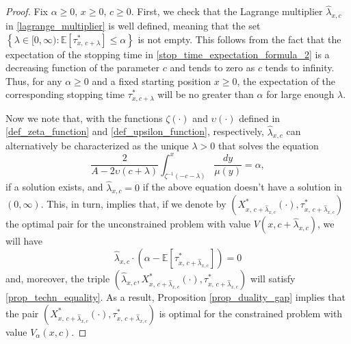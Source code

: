 \documentclass[11pt,tbtags,reqno]{article}
\theoremstyle{definition}
\numberwithin{equation}{section}
\theoremstyle{definition}
\newcommand{\ex}{\mathbb{E}}
\begin{document}
\begin{proof}
Fix $\alpha \ge 0, \, x \ge 0, \, c \ge 0$. First, we check that the Lagrange multiplier $\widehat{\lambda}_{x, c}$ in \eqref{lagrange_multiplier} is well defined, meaning that the set $\left\{\lambda \in [0, \infty): \ex\left[\tau^*_{x, \, c + \lambda}\right] \le \alpha \right\}$ is not empty. This follows from the fact that the expectation of the stopping time in \eqref{stop_time_expectation_formula_2} is a decreasing function of the parameter $c$ and tends to zero as $c$ tends to infinity. Thus, for any $\alpha \ge 0$ and a fixed starting position $x \ge 0$, the expectation of the corresponding stopping time $\tau^*_{x, c + \lambda}$ will be no greater than $\alpha$ for large enough $\lambda$.

Now we note that, with the functions $\zeta(\cdot)$ and $\upsilon(\cdot)$ defined in \eqref{def_zeta_function} and \eqref{def_upsilon_function}, respectively, $\widehat{\lambda}_{x, c}$ can alternatively be characterized as the unique $\lambda > 0$ that solves the equation
\begin{equation}
    \frac{2}{A - 2\upsilon(c + \lambda)}\int_{\zeta^{-1}(-c-\lambda)}^x \frac{dy}{\mu(y)} = \alpha,
\end{equation}
if a solution exists, and $\widehat{\lambda}_{x, c} = 0$ if the above equation doesn't have a solution in $(0, \infty)$. This, in turn, implies that, if we denote by $\left(X^*_{x, \, c + \widehat{\lambda}_{x, c}}(\cdot), \tau^*_{x, \, c + \widehat{\lambda}_{x, c}}\right)$ the optimal pair for the unconstrained problem with value $V\left(x, c + \widehat{\lambda}_{x, c}\right)$, we will have 
\begin{equation}
    \widehat{\lambda}_{x, c} \cdot \left(\alpha - \ex\left[\tau^*_{x, \, c + \widehat{\lambda}_{x, c}} \right] \right) = 0
\end{equation}
and, moreover, the triple $\left(\widehat{\lambda}_{x, c}, X^*_{x, \, c + \widehat{\lambda}_{x, c}}(\cdot), \tau^*_{x, \, c + \widehat{\lambda}_{x, c}} \right)$ will satisfy \eqref{prop_techn_equality}. As a result, Proposition \ref{prop_duality_gap} implies that the pair 
$\left(X^*_{x, \, c + \widehat{\lambda}_{x, c}}(\cdot), \tau^*_{x, \, c + \widehat{\lambda}_{x, c}}\right)$ is optimal for the constrained problem with value $V_\alpha(x, c)$.


\end{proof}
\end{document}
